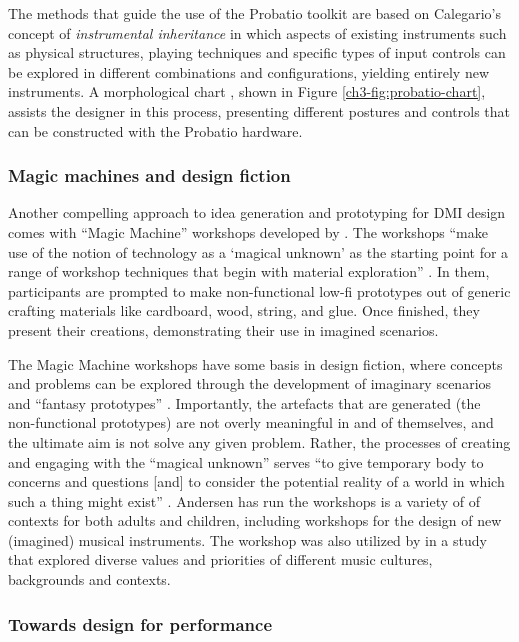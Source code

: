 \documentclass[letterpaper, 12pt]{article}
\begin{document}
The methods that guide the use of the Probatio toolkit are based on Calegario's concept of \emph{instrumental inheritance} in which aspects of existing instruments such as physical structures, playing techniques and specific types of input controls can be explored in different combinations and configurations, yielding entirely new instruments. A morphological chart \citep{Cross2000}, shown in Figure \ref{ch3-fig:probatio-chart}, assists the designer in this process, presenting different postures and controls that can be constructed with the Probatio hardware.

\subsubsection{Magic machines and design fiction}

Another compelling approach to idea generation and prototyping for DMI design comes with ``Magic Machine'' workshops developed by \citet{Andersen2017}. The workshops ``make use of the notion of technology as a `magical unknown' as the starting point for a range of workshop techniques that begin with material exploration'' \citep[p. 4971]{Blythe2016}. In them, participants are prompted to make non-functional low-fi prototypes out of generic crafting materials like cardboard, wood, string, and glue. Once finished, they present their creations, demonstrating their use in imagined scenarios.

The Magic Machine workshops have some basis in design fiction, where concepts and problems can be explored through the development of imaginary scenarios and ``fantasy prototypes'' \citep{Sterling2009}. Importantly, the artefacts that are generated (the non-functional prototypes) are not overly meaningful in and of themselves, and the ultimate aim is not solve any given problem. Rather, the processes of creating and engaging with the ``magical unknown'' serves ``to give temporary body to concerns and questions [and] to consider the potential reality of a world in which such a thing might exist'' \citep[p. 4971]{Blythe2016}. Andersen has run the workshops is a variety of of contexts for both adults and children, including workshops for the design of new (imagined) musical instruments. The workshop was also utilized by \citet{Lepri2019} in a study that explored diverse values and priorities of different music cultures, backgrounds and contexts.

\subsubsection{Towards design for performance}
\label{towards-design-for-performance}
\end{document}
